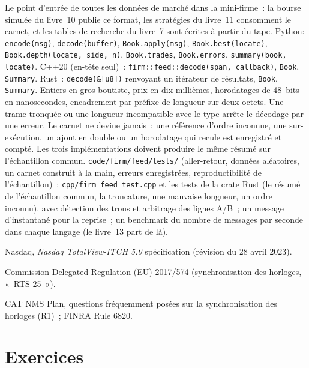 \begin{build}
 Le point d'entrée de toutes les données de marché dans la
mini-firme~: la bourse simulée du livre~10 publie ce format, les
stratégies du livre~11 consomment le carnet, et les tables de recherche du livre~7 sont
écrites à partir du tape.
 Python: \texttt{encode(msg)}, \texttt{decode(buffer)},
\texttt{Book.apply(msg)}, \texttt{Book.best(locate)}, \texttt{Book.depth(locate,
side, n)}, \texttt{Book.trades}, \texttt{Book.errors}, \texttt{summary(book,
locate)}.
C++20 (en-tête seul)~: \texttt{firm::feed::decode(span, callback)},
\texttt{Book}, \texttt{Summary}. Rust~: \texttt{decode(\&[u8])} renvoyant un
itérateur de résultats, \texttt{Book}, \texttt{Summary}.
 Entiers en gros-boutiste, prix en dix-millièmes, horodatages de
48~bits en nanosecondes, encadrement par préfixe de longueur sur deux octets. Une trame
tronquée ou une longueur incompatible avec le type arrête le décodage par une erreur. Le
carnet ne devine jamais~: une référence d'ordre inconnue, une sur-exécution, un ajout en double
ou un horodatage qui recule est enregistré et compté. Les trois implémentations doivent
produire le même résumé sur l'échantillon commun.
 \texttt{code/firm/feed/tests/} (aller-retour, données
aléatoires, un carnet construit à la main, erreurs enregistrées, reproductibilité de
l'échantillon)~; \texttt{cpp/firm\_feed\_test.cpp} et les tests de la crate Rust (le
résumé de l'échantillon commun, la troncature, une mauvaise longueur, un ordre inconnu).
  avec détection des trous et arbitrage
des lignes A/B~; un message d'instantané pour la reprise~; un benchmark du nombre de messages
par seconde dans chaque langage (le livre~13 part de là).
\end{build}

\begin{omsources}
\item Nasdaq, \emph{Nasdaq TotalView-ITCH 5.0} spécification (révision du 28
avril 2023).
\item Commission Delegated Regulation (EU) 2017/574 (synchronisation des horloges,
«~RTS 25~»).
\item CAT NMS Plan, questions fréquemment posées sur la synchronisation des horloges
(R1)~; FINRA Rule 6820.
\end{omsources}

\section{Exercices}

